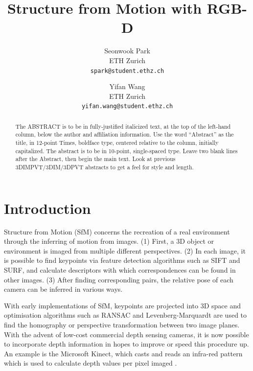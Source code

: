 \documentclass[10pt,twocolumn,letterpaper]{article}
\begin{document}
\title{Structure from Motion with RGB-D}

\author{Seonwook Park \\
ETH Zurich \\
{\tt\small spark@student.ethz.ch}
\and
Yifan Wang \\
ETH Zurich \\
{\tt\small yifan.wang@student.ethz.ch}
}

\maketitle

\begin{abstract}
   The ABSTRACT is to be in fully-justified italicized text, at the top
   of the left-hand column, below the author and affiliation
   information. Use the word ``Abstract'' as the title, in 12-point
   Times, boldface type, centered relative to the column, initially
   capitalized. The abstract is to be in 10-point, single-spaced type.
   Leave two blank lines after the Abstract, then begin the main text.
   Look at previous 3DIMPVT/3DIM/3DPVT abstracts to get a feel for style and length.
\end{abstract}

\section{Introduction}

Structure from Motion (SfM) concerns the recreation of a real environment
through the inferring of motion from images. (1) First, a 3D object or
environment is imaged from multiple different perspectives. (2) In each image,
it is possible to find keypoints via feature detection algorithms such as SIFT
and SURF, and calculate descriptors with which correspondences can be found in
other images. (3) After finding corresponding pairs, the relative pose of each
camera can be inferred in various ways.

With early implementations of SfM, keypoints are projected into 3D space and
optimisation algorithms such as RANSAC and Levenberg-Marquardt are used to find
the homography or perspective transformation between two image planes. With the
advent of low-cost commercial depth sensing cameras, it is now possible to
incorporate depth information in hopes to improve or speed this procedure up. An
example is the Microsoft Kinect, which casts and reads an infra-red pattern
which is used to calculate depth values per pixel imaged \cite{zhang2012microsoft}.
\end{document}
